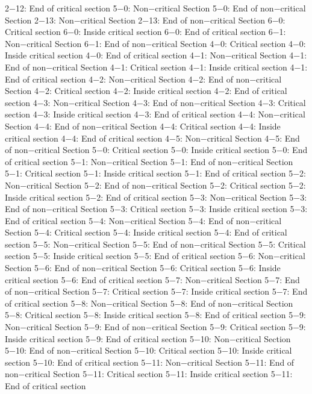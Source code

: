 2−12: End of critical section
5−0: Non−critical Section
5−0: End of non−critical Section
2−13: Non−critical Section
2−13: End of non−critical Section
6−0: Critical section
6−0: Inside critical section
6−0: End of critical section
6−1: Non−critical Section
6−1: End of non−critical Section
4−0: Critical section
4−0: Inside critical section
4−0: End of critical section
4−1: Non−critical Section
4−1: End of non−critical Section
4−1: Critical section
4−1: Inside critical section
4−1: End of critical section
4−2: Non−critical Section
4−2: End of non−critical Section
4−2: Critical section
4−2: Inside critical section
4−2: End of critical section
4−3: Non−critical Section
4−3: End of non−critical Section
4−3: Critical section
4−3: Inside critical section
4−3: End of critical section
4−4: Non−critical Section
4−4: End of non−critical Section
4−4: Critical section
4−4: Inside critical section
4−4: End of critical section
4−5: Non−critical Section
4−5: End of non−critical Section
5−0: Critical section
5−0: Inside critical section
5−0: End of critical section
5−1: Non−critical Section
5−1: End of non−critical Section
5−1: Critical section
5−1: Inside critical section
5−1: End of critical section
5−2: Non−critical Section
5−2: End of non−critical Section
5−2: Critical section
5−2: Inside critical section
5−2: End of critical section
5−3: Non−critical Section
5−3: End of non−critical Section
5−3: Critical section
5−3: Inside critical section
5−3: End of critical section
5−4: Non−critical Section
5−4: End of non−critical Section
5−4: Critical section
5−4: Inside critical section
5−4: End of critical section
5−5: Non−critical Section
5−5: End of non−critical Section
5−5: Critical section
5−5: Inside critical section
5−5: End of critical section
5−6: Non−critical Section
5−6: End of non−critical Section
5−6: Critical section
5−6: Inside critical section
5−6: End of critical section
5−7: Non−critical Section
5−7: End of non−critical Section
5−7: Critical section
5−7: Inside critical section
5−7: End of critical section
5−8: Non−critical Section
5−8: End of non−critical Section
5−8: Critical section
5−8: Inside critical section
5−8: End of critical section
5−9: Non−critical Section
5−9: End of non−critical Section
5−9: Critical section
5−9: Inside critical section
5−9: End of critical section
5−10: Non−critical Section
5−10: End of non−critical Section
5−10: Critical section
5−10: Inside critical section
5−10: End of critical section
5−11: Non−critical Section
5−11: End of non−critical Section
5−11: Critical section
5−11: Inside critical section
5−11: End of critical section
